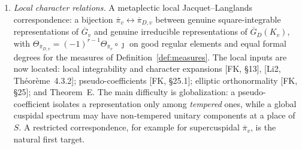 \documentclass[12pt]{article}
\newcommand{\ov}[1]{\overline{#1}}
\newcommand{\Gb}{\ov{G}}
\newcommand{\GDb}{\ov{G}_D}
\newcommand{\pib}{\ov{\pi}}
\newcommand{\jj}{\jmath}
\theoremstyle{plain}
\theoremstyle{definition}
\begin{document}
\begin{enumerate}[label=(\roman*),start=2]
\item \emph{Local character relations.} A metaplectic local Jacquet--Langlands correspondence: a bijection $\pib_v\leftrightarrow\pib_{D,v}$ between genuine square-integrable representations of $\Gb_v$ and genuine irreducible representations of $\GDb(K_v)$, with $\Theta_{\pib_{D,v}}=(-1)^{r-1}\Theta_{\pib_v}\circ\jj$ on good regular elements and equal formal degrees for the measures of Definition~\ref{def:measures}. The local inputs are now located: local integrability and character expansions [FK, \S13], [Li2, Th\'eor\`eme~4.3.2]; pseudo-coefficients [FK, \S25.1]; elliptic orthonormality [FK, \S25]; and Theorem~E. The main difficulty is globalization: a pseudo-coefficient isolates a representation only among \emph{tempered} ones, while a global cuspidal spectrum may have non-tempered unitary components at a place of $S$. A restricted correspondence, for example for supercuspidal $\pib_v$, is the natural first target.


\end{enumerate}
\end{document}
